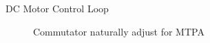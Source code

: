 


\begin{frame}{}
	\maketitle
\end{frame}


\begin{frame}{DC Motor Control Loop}
	\begin{figure}
		\centering
		\caption{Commutator naturally adjust for MTPA}
	\end{figure}
\end{frame}


